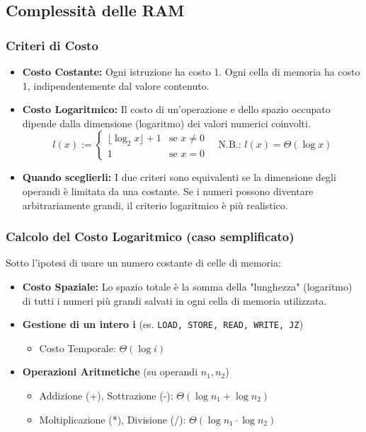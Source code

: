\subsection{Complessità delle RAM}

\subsubsection{Criteri di Costo}
\begin{itemize}
    \item \textbf{Costo Costante:} Ogni istruzione ha costo 1. Ogni cella di memoria ha costo 1, indipendentemente dal valore contenuto.
    \item \textbf{Costo Logaritmico:} Il costo di un'operazione e dello spazio occupato dipende dalla dimensione (logaritmo) dei valori numerici coinvolti.
    $$
    l(x) := 
    \begin{cases}
        \lfloor \log_2 x \rfloor + 1 & \text{se } x \neq 0 \\
        1 & \text{se } x = 0
    \end{cases}
    \quad \text{N.B.: } l(x) = \Theta(\log x)
    $$
    \item \textbf{Quando sceglierli:} I due criteri sono equivalenti se la dimensione degli operandi è limitata da una costante. Se i numeri possono diventare arbitrariamente grandi, il criterio logaritmico è più realistico.
\end{itemize}

\subsubsection{Calcolo del Costo Logaritmico (caso semplificato)}
Sotto l'ipotesi di usare un numero costante di celle di memoria:
\begin{itemize}
    \item \textbf{Costo Spaziale:} Lo spazio totale è la somma della "lunghezza" (logaritmo) di tutti i numeri più grandi salvati in ogni cella di memoria utilizzata.
    \item \textbf{Gestione di un intero i} (es. \texttt{LOAD, STORE, READ, WRITE, JZ})
    \begin{itemize}
        \item Costo Temporale: $\Theta(\log i)$
    \end{itemize}
    \item \textbf{Operazioni Aritmetiche} (su operandi $n_1, n_2$)
    \begin{itemize}
        \item Addizione (+), Sottrazione (-): $\Theta(\log n_1 + \log n_2)$
        \item Moltiplicazione (*), Divisione (/): $\Theta(\log n_1 \cdot \log n_2)$
    \end{itemize}
\end{itemize}

